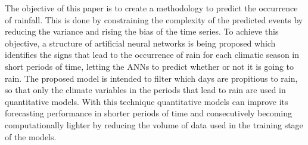 The objective of this paper is to create a methodology to predict the occurrence of rainfall. This is done by constraining the complexity of the predicted events by reducing the variance and rising the bias of the time series. To achieve this objective, a structure of artificial neural networks is being proposed which identifies the signs that lead to the occurrence of rain for each climatic season in short periods of time, letting the ANNs to predict whether or not it is going to rain. The proposed model is intended to filter which days are propitious to rain, so that only the climate variables in the periods that lead to rain are used in quantitative models. With this technique quantitative models can improve its forecasting performance in shorter periods of time and consecutively becoming computationally lighter by reducing the volume of data used in the training stage of the models. 



%
%
